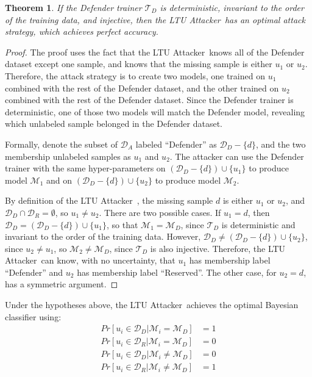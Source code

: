 \documentclass[letterpaper]{article}
\newcommand{\sminus}{-}
\newcommand{\oracle}{LTU Attacker~}
\newtheorem{theorem}{Theorem}
\begin{document}
\begin{theorem}\label{thm:deterministic} If the Defender trainer $\mathcal{T}_D$ is deterministic, invariant to the order of the training data, and injective, then the \oracle has an optimal attack strategy, which achieves perfect accuracy.
\end{theorem}
\begin{proof}
The proof uses the fact that the \oracle knows all of the Defender dataset except one sample, and knows that the missing sample is either $u_1$ or $u_2$.  Therefore, the attack strategy is to create two models, one trained on $u_1$ combined with the rest of the Defender dataset, and the other trained on $u_2$ combined with the rest of the Defender dataset. Since the Defender trainer is deterministic, one of those two models will match the Defender model, revealing which unlabeled sample belonged in the Defender dataset.

Formally, denote the subset of $\mathcal{D}_A$ labeled ``Defender'' as $\mathcal{D}_D\sminus\{d\}$, and the two membership unlabeled samples as $u_1$ and $u_2$. The attacker can use the Defender trainer with the same hyper-parameters on $\left(\mathcal{D}_D\sminus\{d\} \right) \cup \{u_1\}$ to produce model $\mathcal{M}_1$ and on $\left(\mathcal{D}_D\sminus\{d\} \right) \cup \{u_2\}$ to produce model $\mathcal{M}_2$.

By definition of the \oracle, the missing sample $d$ is either $u_1$ or $u_2$, and $\mathcal{D}_D \cap \mathcal{D}_R = \emptyset$, so $u_1 \ne u_2$.
There are two possible cases. If $u_1 = d$, then $\mathcal{D}_D = \left(\mathcal{D}_D\sminus\{d\} \right) \cup \{u_1\}$, so that
$\mathcal{M}_1 = \mathcal{M}_{D}$, since $\mathcal{T}_D$ is deterministic and invariant to the order of the training data. However, $\mathcal{D}_D \ne \left(\mathcal{D}_D\sminus\{d\} \right) \cup \{u_2\}$, since $u_2 \ne u_1$, so
$\mathcal{M}_2 \ne \mathcal{M}_{D}$,
since $\mathcal{T}_D$ is also injective. Therefore, the \oracle can know, with no uncertainty, that $u_1$ has membership label ``Defender'' and $u_2$ has membership label ``Reserved''. The other case, for $u_2 = d$, has a symmetric argument.
\end{proof}
Under the hypotheses above, the \oracle achieves the optimal Bayesian classifier using:
\begin{align*}
Pr[u_i \in \mathcal{D}_{D} | \mathcal{M}_{i} = \mathcal{M}_{D}] &= 1 \\
Pr[u_i \in \mathcal{D}_{R} | \mathcal{M}_{i} = \mathcal{M}_{D}] &= 0 \\
Pr[u_i \in \mathcal{D}_{D} | \mathcal{M}_{i} \ne \mathcal{M}_{D}] &= 0 \\
Pr[u_i \in \mathcal{D}_{R} | \mathcal{M}_{i} \ne \mathcal{M}_{D}] &= 1 \\
\end{align*}
\end{document}
